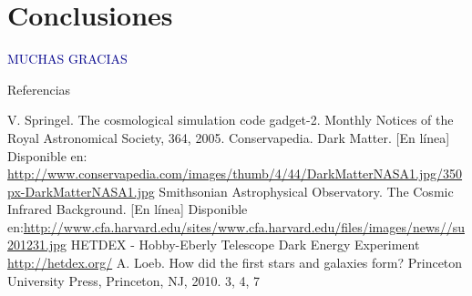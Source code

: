 \documentclass{beamer}
\begin{document}
\section{Conclusiones}
	\begin{frame}
		\begin{center}
			\textcolor{darkblue}{\Huge{MUCHAS GRACIAS}}
		\end{center}
		
	\end{frame}
	\begin{frame}[allowframebreaks]{Referencias}
		\begin{thebibliography}{}
			 V. Springel. The cosmological simulation code gadget-2. Monthly Notices of the Royal Astronomical Society, 364, 2005.
			 Conservapedia. Dark Matter. [En línea] Disponible en: \url{http://www.conservapedia.com/images/thumb/4/44/DarkMatterNASA1.jpg/350px-DarkMatterNASA1.jpg}
			 Smithsonian Astrophysical Observatory. The Cosmic Infrared Background. [En línea] Disponible en:\url{http://www.cfa.harvard.edu/sites/www.cfa.harvard.edu/files/images/news//su201231.jpg}	
			 HETDEX - Hobby-Eberly Telescope Dark Energy Experiment \url{http://hetdex.org/}
			 A. Loeb. How did the first stars and galaxies form? Princeton University Press, Princeton, NJ,
2010. 3, 4, 7

			
	\end{thebibliography}
%	
%	
	\end{frame}
\end{document}
